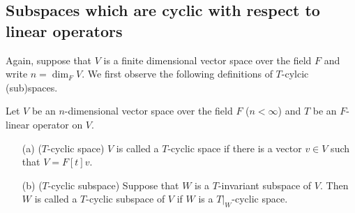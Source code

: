 \subsection{Subspaces which are cyclic with respect to linear operators}

Again, suppose that  $V$ is a finite dimensional vector space over the field $F$ and write $n=\dim_F V$.
We first observe the following definitions of $T$-cylcic (sub)spaces.
\begin{defi}\label{old cylcic spaces in vector spaces}
    Let $V$ be an $n$-dimensional vector space over the field $F$ ($n<\infty$) and $T$ be an $F$-linear operator on $V$.
    \begin{enumerate}
        \item[(a)]
        {
            ($T$-cyclic space)
            $V$ is called a $T$-cyclic space if there is a vector $v\in V$ such that $V=F[t]v$.
        }
        \item[(b)]
        {
            ($T$-cyclic subspace)
            Suppose that $W$ is a $T$-invariant subspace of $V$.
            Then $W$ is called a $T$-cyclic subspace of $V$ if $W$ is a $T|_W$-cyclic space.
        }
    \end{enumerate}
\end{defi}
